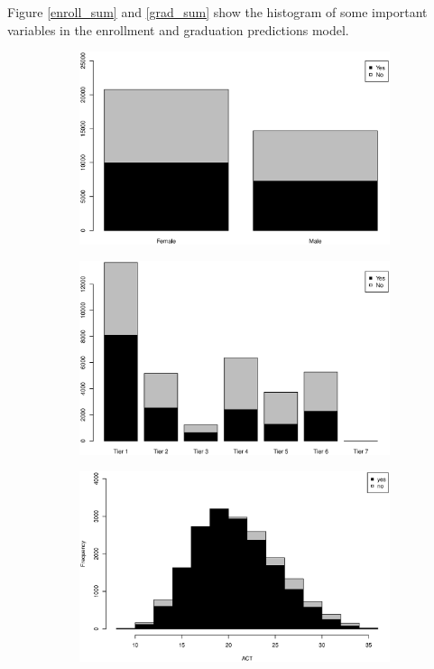 \documentclass[12pt,english]{report}
\begin{document}
Figure \ref{enroll_sum} and \ref{grad_sum} show the histogram of some 
important variables in the enrollment and graduation predictions model.



\begin{figure}[p] 

\begin{subfigure}{0.48\textwidth}
\includegraphics[width=\linewidth]{pic/enroll_gender}
\caption{} \label{enroll:a}
\end{subfigure}\hspace*{\fill}
\begin{subfigure}{0.48\textwidth }
\includegraphics[width=\linewidth]{pic/enroll_tier}
\caption{} \label{enroll:b}
\end{subfigure}
\medskip
\begin{subfigure}{0.48\textwidth}
\includegraphics[width=\linewidth] {pic/enroll_act}

\end{subfigure}
\end{figure}
\end{document}

